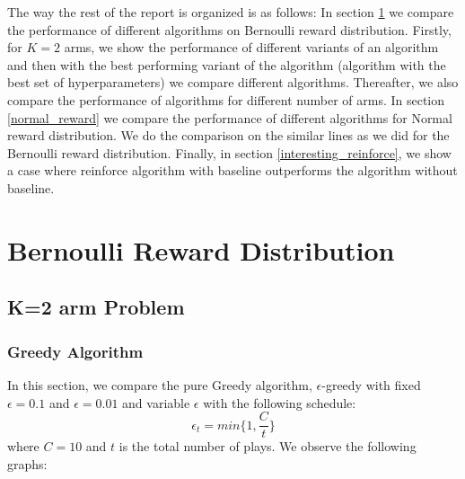 \documentclass{article}
\begin{document}
	The way the rest of the report is organized is as follows: In section \ref{bernoulli_reward} we compare the performance of different algorithms on Bernoulli
	reward distribution. Firstly, for $K=2$ arms, we show the performance of different variants of an algorithm and then with the best performing variant of the
	algorithm (algorithm with the best set of hyperparameters) we compare different algorithms. Thereafter, we also compare the performance of algorithms for 
	different number of arms. In section \ref{normal_reward} we compare the performance of different algorithms for Normal reward distribution. We do the comparison
	on the similar lines as we did for the Bernoulli reward distribution. Finally, in section \ref{interesting_reinforce}, we show a case where reinforce algorithm
	with baseline outperforms the algorithm without baseline.

\section{Bernoulli Reward Distribution}
	\label{bernoulli_reward}
	\subsection{K=2 arm Problem}
		\subsubsection{Greedy Algorithm}
		
		In this section, we compare the pure Greedy algorithm, $\epsilon$-greedy with fixed $\epsilon=0.1$ and $\epsilon=0.01$ and variable $\epsilon$ with the 
		following schedule:
		\begin{equation}
			\epsilon_{t} = min\{1, \frac{C}{t}\}
		\label{epsilon_greedy_schedule}
		\end{equation}
		where $C=10$ and $t$ is the total number of plays. We observe the following graphs:
		
\end{document}
